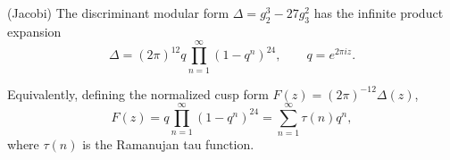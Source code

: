 (Jacobi) The discriminant modular form $\Delta = g_2^3 - 27 g_3^2$ has the infinite product expansion
$$\Delta = (2\pi)^{12} q \prod_{n=1}^{\infty} (1 - q^n)^{24}, \qquad q = e^{2\pi i z}.$$

Equivalently, defining the normalized cusp form $F(z) = (2\pi)^{-12} \Delta(z)$,
$$F(z) = q \prod_{n=1}^{\infty} (1 - q^n)^{24} = \sum_{n=1}^{\infty} \tau(n) q^n,$$
where $\tau(n)$ is the Ramanujan tau function.
